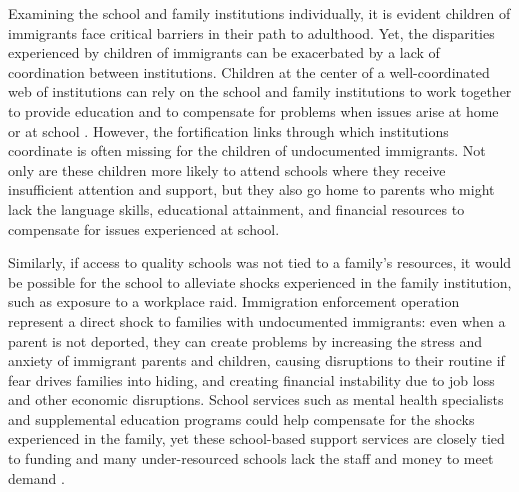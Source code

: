 \documentclass[hidelinks,twoside]{article}
\begin{document}
Examining the school and family institutions individually, it is evident children of immigrants face critical barriers in their path to adulthood. Yet, the disparities experienced by children of immigrants can be exacerbated by a lack of coordination between institutions. Children at the center of a well-coordinated web of institutions can rely on the school and family institutions to work together to provide education and to compensate for problems when issues arise at home or at school \citep{jackson_2020_manifesto}. However, the fortification links through which institutions coordinate is often missing for the children of undocumented immigrants. Not only are these children more likely to attend schools where they receive insufficient attention and support, but they also go home to parents who might lack the language skills, educational attainment, and financial resources to compensate for issues experienced at school. 

Similarly, if access to quality schools was not tied to a family’s resources, it would be possible for the school to alleviate shocks experienced in the family institution, such as exposure to a workplace raid. Immigration enforcement operation represent a direct shock to families with undocumented immigrants: even when a parent is not deported, they can create problems by increasing the stress and anxiety of immigrant parents and children, causing disruptions to their routine if fear drives families into hiding, and creating financial instability due to job loss and other economic disruptions. School services such as mental health specialists and supplemental education programs could help compensate for the shocks experienced in the family, yet these school-based support services are closely tied to funding and many under-resourced schools lack the staff and money to meet demand \citep{schaeffer_2022_just,afterschoolalliance_2020_2020}.
\end{document}
